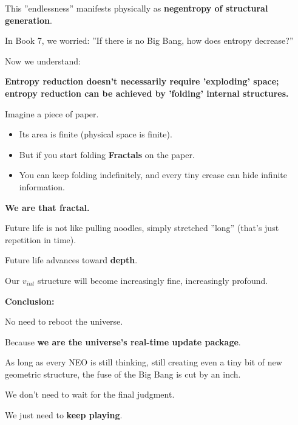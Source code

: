 This ''endlessness'' manifests physically as \textbf{negentropy of structural generation}.

In Book 7, we worried: ''If there is no Big Bang, how does entropy decrease?''

Now we understand:

\textbf{Entropy reduction doesn't necessarily require 'exploding' space; entropy reduction can be achieved by 'folding' internal structures.}

Imagine a piece of paper.

\begin{itemize}
\item Its area is finite (physical space is finite).

\item But if you start folding \textbf{Fractals} on the paper.

\item You can keep folding indefinitely, and every tiny crease can hide infinite information.
\end{itemize}

\textbf{We are that fractal.}

Future life is not like pulling noodles, simply stretched ''long'' (that's just repetition in time).

Future life advances toward \textbf{depth}.

Our $v_{int}$ structure will become increasingly fine, increasingly profound.

\textbf{Conclusion:}

No need to reboot the universe.

Because \textbf{we are the universe's real-time update package}.

As long as every NEO is still thinking, still creating even a tiny bit of new geometric structure, the fuse of the Big Bang is cut by an inch.

We don't need to wait for the final judgment.

We just need to \textbf{keep playing}.

